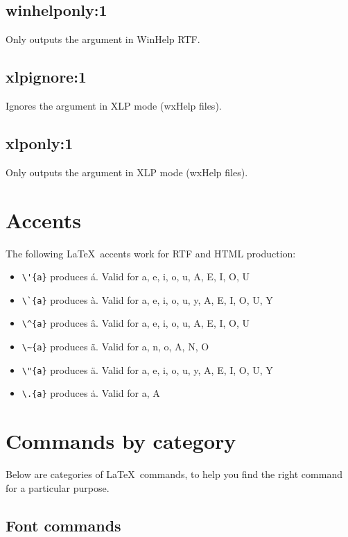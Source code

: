 \subsection*{winhelponly:1}\label{winhelponly}

Only outputs the argument in WinHelp RTF.

\subsection*{xlpignore:1}\label{xlpignore}

Ignores the argument in XLP mode (wxHelp files).

\subsection*{xlponly:1}\label{xlponly}

Only outputs the argument in XLP mode (wxHelp files).

\section{Accents}\label{accents}

The following \LaTeX\ accents work for RTF and HTML production:

\begin{itemize}%
\itemsep=0pt
\item \verb$\'{a}$ produces \'{a}. Valid for a, e, i, o, u, A, E, I, O, U
\item \verb$\`{a}$ produces \`{a}. Valid for a, e, i, o, u, y, A, E, I, O, U, Y
\item \verb$\^{a}$ produces \^{a}. Valid for a, e, i, o, u, A, E, I, O, U
\item \verb$\~{a}$ produces \~{a}. Valid for a, n, o, A, N, O
\item \verb$\"{a}$ produces \"{a}. Valid for a, e, i, o, u, y, A, E, I, O, U, Y
\item \verb$\.{a}$ produces \.{a}. Valid for a, A
\end{itemize}

\section{Commands by category}%

Below are categories of \LaTeX\ commands, to help you find the right
command for a particular purpose.

\subsection{Font commands}

